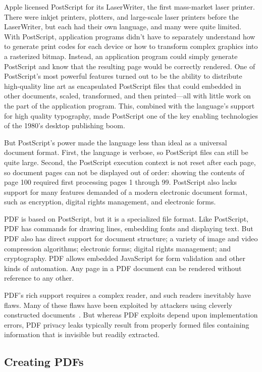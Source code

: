 Apple licensed PostScript for its LaserWriter, the first mass-market
laser printer. There were inkjet printers, plotters, and large-scale
laser printers before the LaserWriter, but each had their own
language, and many were quite limited. With PostScript, application
programs didn't have to separately understand how to generate print
codes for each device or how to transform complex graphics into a
rasterized bitmap. Instead, an application program could simply
generate PostScript and know that the resulting page would be
correctly rendered. One of PostScript's most powerful features turned
out to be the ability to distribute high-quality line art as
encapsulated PostScript files that could embedded in other documents,
scaled, transformed, and then printed---all with little work on the
part of the application program. This, combined with the language's
support for high quality typography, made PostScript one of the key
enabling technologies of the 1980's desktop publishing boom.

But PostScript's power made the language
less than ideal as a universal document format. First, the language
 is  verbose, so PostScript files can still be quite
large. Second, the PostScript execution context is not reset
after each page, so document pages can not be displayed out of
order: showing the contents of page 100 required first processing pages 1 through 99. PostScript also
lacks support for many features demanded of a modern electronic document format,
such as encryption, digital rights management, and electronic forms.

PDF is based on PostScript, but it is a specialized file format. Like PostScript, PDF has
commands for drawing lines, embedding fonts and displaying text. But PDF also has direct support for
document structure; a variety of image and video compression
algorithms; electronic forms; digital rights management; and
cryptography. PDF allows embedded JavaScript for form validation
and other kinds of automation. Any page in a PDF document can be
rendered without reference to any other. 

PDF's rich support requires a complex reader, and such readers inevitably have flaws. Many of these flaws
have been exploited by attackers using cleverly constructed
documents~\cite{5705599}. But whereas PDF exploits depend upon
implementation errors, PDF privacy leaks typically result from
properly formed files  containing information that is invisible but
readily extracted. 

\subsection{Creating PDFs}

